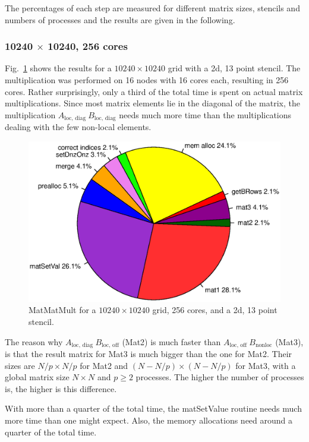 The percentages of each step are measured for different matrix sizes, stencils and numbers of processes and the results are given in the following.

\subsubsection*{10240 $\times$ 10240, 256 cores}
Fig.~\ref{fig:pie_256_10240} shows the results for a $10240 \times 10240$ grid with a 2d, 13 point stencil. The multiplication was performed on 16 nodes with 16 cores each, resulting in 256 cores. Rather surprisingly, only a third of the total time is spent on actual matrix multiplications. Since most matrix elements lie in the diagonal of the matrix, the multiplication $A_{\textrm{loc, diag}}~B_{\textrm{loc, diag}}$ needs much more time than the multiplications dealing with the few non-local elements. 

\begin{figure}[tbp]
	\centering
	\includegraphics[width=1\textwidth, trim={0 3.cm 0 3cm},clip]{256cores_10240}
	\caption{MatMatMult for a $10240\times 10240$ grid, 256 cores, and a 2d, 13 point stencil.} 
	\label{fig:pie_256_10240}
\end{figure}

The reason why $A_{\textrm{loc, diag~}} B_{\textrm{loc, off}}$ (Mat2) is much faster than $A_{\textrm{loc, off~}} B_{\textrm{nonloc}}$ (Mat3), is that the result matrix for Mat3 is much bigger than the one for Mat2. Their sizes are $N/p \times N/p$ for Mat2 and $(N-N/p) \times (N-N/p)$ for Mat3, with a global matrix size $N\times N$ and $p\geq2$ processes. The higher the number of processes is, the higher is this difference.

With more than a quarter of the total time, the matSetValue routine needs much more time than one might expect. Also, the memory allocations need around a quarter of the total time. 

